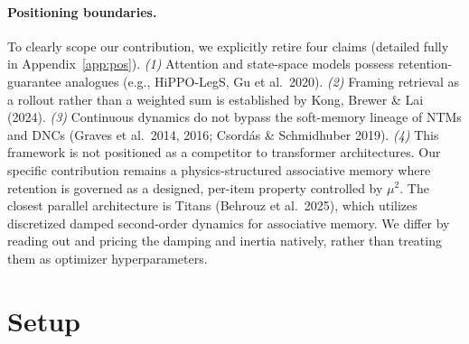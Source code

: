 \documentclass{article}
\begin{document}
\paragraph{Positioning boundaries.} To clearly scope our contribution, we explicitly retire four claims (detailed fully in Appendix~\ref{app:pos}). \emph{(1)} Attention and state-space models possess retention-guarantee analogues (e.g., HiPPO-LegS, Gu et al.\ 2020). \emph{(2)} Framing retrieval as a rollout rather than a weighted sum is established by Kong, Brewer \& Lai (2024). \emph{(3)} Continuous dynamics do not bypass the soft-memory lineage of NTMs and DNCs (Graves et al.\ 2014, 2016; Csord\'as \& Schmidhuber 2019). \emph{(4)} This framework is not positioned as a competitor to transformer architectures. Our specific contribution remains a physics-structured associative memory where retention is governed as a designed, per-item property controlled by $\mu^2$. The closest parallel architecture is Titans (Behrouz et al.\ 2025), which utilizes discretized damped second-order dynamics for associative memory. We differ by reading out and pricing the damping and inertia natively, rather than treating them as optimizer hyperparameters.

\section{Setup}\label{sec:setup}
\end{document}
